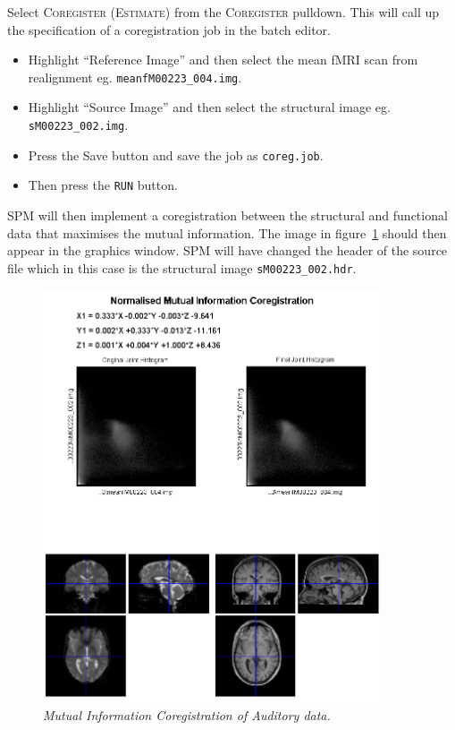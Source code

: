 Select \textsc{Coregister (Estimate)} from the \textsc{Coregister} pulldown. This will call up the specification of a coregistration job in the batch editor. 

\begin{itemize}
\item Highlight ``Reference Image'' and then select the mean fMRI scan from realignment eg. \texttt{meanfM00223\_004.img}.
\item Highlight ``Source Image'' and then select the structural image eg. \texttt{sM00223\_002.img}.
\item Press the Save button and save the job as \texttt{coreg.job}.
\item Then press the \texttt{RUN} button.
\end{itemize}

SPM will then implement a coregistration between the structural and functional data that maximises the mutual information. The image in figure~\ref{aud_coreg} should then appear in the graphics window. SPM will have changed the header of the source file which in this case is the structural image \texttt{sM00223\_002.hdr}.
\begin{figure}
\begin{center}
\includegraphics[width=100mm]{auditory/coreg}
\caption{\em Mutual Information Coregistration of Auditory data.\label{aud_coreg}}
\end{center}
\end{figure}

